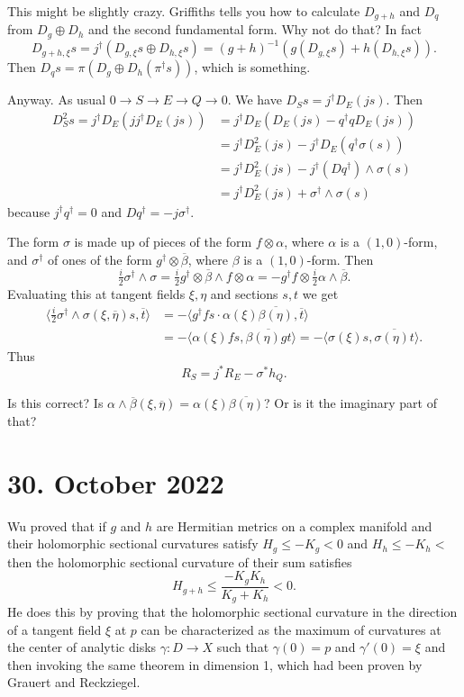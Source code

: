 \documentclass[11pt]{amsart}
\theoremstyle{definition}
\def\ov#1{\overline{#1}}
\begin{document}
This might be slightly crazy.
Griffiths tells you how to calculate $D_{g+h}$ and $D_q$ from $D_g \oplus D_h$
and the second fundamental form. Why not do that?
In fact
$$
D_{g + h, \xi} s
= j^\dagger (D_{g, \xi} s \oplus D_{h, \xi} s)
= (g+h)^{-1}(g(D_{g, \xi} s) + h(D_{h, \xi} s)).
$$
Then $D_q s = \pi(D_{g} \oplus D_h (\pi^\dagger s))$, which is something.


Anyway.
As usual $0 \to S \to E \to Q \to 0$.
We have $D_S s = j^\dagger D_E(js)$.
Then
\begin{align*}
D^2_S s = j^\dagger D_E(j j^\dagger D_E (js))
&= j^\dagger D_E(D_E(js) - q^\dagger q D_E(js))
\\
&= j^\dagger D^2_E(js) - j^\dagger D_E( q^\dagger \sigma(s))
\\
&= j^\dagger D^2_E(js) - j^\dagger (D q^\dagger) \wedge \sigma(s)
\\
&= j^\dagger D^2_E(js) + \sigma^\dagger \wedge \sigma(s)
\end{align*}
because $j^\dagger q^\dagger = 0$ and $D q^\dagger = -j \sigma^\dagger$.


The form $\sigma$ is made up of pieces of the form $f \otimes \alpha$, where
$\alpha$ is a $(1,0)$-form, and $\sigma^\dagger$ of ones of the form $g^\dagger
\otimes \ov\beta$, where $\beta$ is a $(1,0)$-form. Then
$$
\tfrac i2 \sigma^\dagger \wedge \sigma
= \tfrac i2 g^\dagger \otimes \ov\beta \wedge f \otimes \alpha
= - g^\dagger f \otimes \tfrac i2 \alpha \wedge \ov\beta.
$$
Evaluating this at tangent fields $\xi, \eta$ and sections $s,t$ we get
\begin{align*}
\langle \tfrac i2 \sigma^\dagger \wedge \sigma(\xi, \ov\eta) s, \ov t \rangle
&= -\langle g^\dagger f s \cdot \alpha(\xi) \ov{\beta(\eta)}  , \ov t \rangle
\\
&= - \langle \alpha(\xi) fs, \ov{\beta(\eta) g t} \rangle
= - \langle \sigma(\xi) s, \ov{\sigma(\eta) t} \rangle.
\end{align*}
Thus
$$
R_S = j^*R_E - \sigma^* h_Q.
$$

Is this correct? Is $\alpha \wedge \ov\beta(\xi, \ov\eta) = \alpha(\xi)
\ov{\beta(\eta)}$? Or is it the imaginary part of that?



\section{30. October 2022}

Wu \cite{wu1973remark} proved that if $g$ and $h$ are Hermitian metrics on a
complex manifold and their holomorphic sectional curvatures satisfy $H_g \leq
-K_g < 0$ and $H_h \leq -K_h < $ then the holomorphic sectional curvature of
their sum satisfies
\[
H_{g + h} \leq \frac{-K_g K_h}{K_g + K_h} < 0.
\]
He does this by proving that the holomorphic sectional curvature in the
direction of a tangent field $\xi$ at $p$ can be characterized as the maximum
of curvatures at the center of analytic disks $\gamma : D \to X$ such that
$\gamma(0) = p$ and $\gamma'(0) = \xi$ and then invoking the same theorem in
dimension 1, which had been proven by Grauert and Reckziegel.
\end{document}
